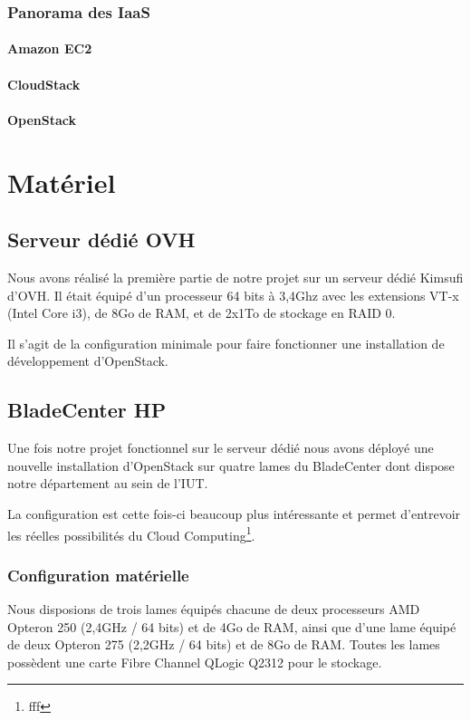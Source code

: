 \documentclass{report}
\begin{document}
\newpage
\subsection{Panorama des IaaS}
\subsubsection{Amazon EC2}
\subsubsection{CloudStack}
\subsubsection{OpenStack}


\chapter{Matériel}

\section{Serveur dédié OVH}
Nous avons réalisé la première partie de notre projet sur un serveur dédié Kimsufi d'OVH. Il était équipé d'un processeur 64 bits à 3,4Ghz avec les extensions VT-x (Intel Core i3), de 8Go de RAM, et de 2x1To de stockage en RAID 0.

Il s'agit de la configuration minimale pour faire fonctionner une installation de développement d'OpenStack.

\section{BladeCenter HP}
Une fois notre projet fonctionnel sur le serveur dédié nous avons déployé une nouvelle installation d'OpenStack sur quatre lames du BladeCenter dont dispose notre département au sein de l'IUT.

La configuration est cette fois-ci beaucoup plus intéressante et permet d'entrevoir les réelles possibilités du Cloud Computing\footnote{fff}.

\subsection{Configuration matérielle}
Nous disposions de trois lames équipés chacune de deux processeurs AMD Opteron 250 (2,4GHz / 64 bits) et de 4Go de RAM, ainsi que d'une lame équipé de deux Opteron 275 (2,2GHz / 64 bits) et de 8Go de RAM.\newline
Toutes les lames possèdent une carte Fibre Channel QLogic Q2312 pour le stockage.
\end{document}
